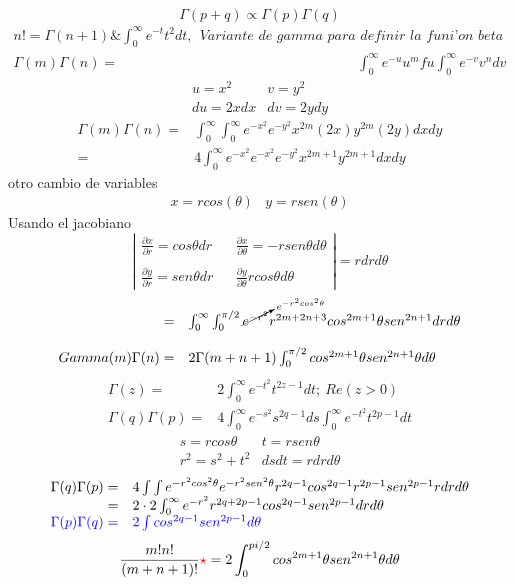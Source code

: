\documentclass{article}
\theoremstyle{definition}
\begin{document}
\[\Gamma (p+q)\propto \Gamma (p)\Gamma (q)\]
\[
\begin{array}{rl}
	n!= \Gamma (n+1)\& \int^{\infty}_0 e^{-t}t^2 dt,\ \ \textit{Variante de gamma para definir la funi'on beta}\\
	\Gamma (m)\Gamma (n)=& \int^{\infty}_0 e^{-u}u^m fu\int^{\infty}_0 e^{-v}v^n dv
\end{array}
\]
\[
\begin{array}{cc}
	u=x^2 & v=y^2\\
	du=2xdx & dv= 2ydy
\end{array}
\]
\[
\begin{array}{rl}
	\Gamma (m)\Gamma (n) =& \int^{\infty}_0 \int^{\infty}_0e^{-x^{2}}e^{-y^{2}}x^{2m}(2x)y^{2m}(2y)dxdy\\
	=& 4\int^{\infty}_0 e^{-x^{2}} e^{-x^{2}}e^{-y^{2}}x^{2m+1}y^{2m+1}dxdy
\end{array}
\]
otro cambio de variables
\[
\begin{array}{cc}
	x=rcos(\theta) & y=rsen(\theta)
\end{array}
\]
Usando el jacobiano
\[
\left|
\begin{array}{ccc}
	\frac{\partial x}{\partial r}= cos\theta dr && \frac{\partial x}{\partial \theta} =-rsen\theta d\theta\\
	\\
	\frac{\partial y}{\partial r} = sen\theta dr && \frac{\partial y}{\partial \theta} r cos\theta d\theta
\end{array}\right|
=rdrd\theta
\]
\[
\begin{array}{rl}
	=& \int^{\infty}_0\int^{\pi/2}_0 \cancelto{e^{-r^2cos^2\theta}}{e^{-r^2}} r^{2m+2n+3} cos^{2m+1}\theta sen ^{2n+1}drd\theta\\
	\\Gamma (m)\Gamma (n) =& 2 \Gamma (m+n+1)\int^{\pi/2}_0 cos^{2m+1}\theta sen^{2n+1}\theta d\theta
\end{array}
\]
\[
\begin{array}{rl}
	\Gamma (z)=& 2 \int^{\infty}_0 e^{-t^2}t^{2z-1}dt;\ Re(z>0)\\
	\Gamma (q)\Gamma (p) =& 4\int^{\infty}_0 e^{-s^2} s^{2q-1}ds\int^{\infty}_0 e^{-t^2}t^{2p-1}dt
\end{array}
\]
\[
\begin{array}{cc}
	s=rcos\theta & t=rsen\theta\\
	r^2=s^2+t^2 & dsdt=rdrd\theta
\end{array}
\]
\[
\begin{array}{rl}
	\Gamma (q)\Gamma (p)=& 4\int\int e^{-r^2cos^2\theta}e^{-r^2sen^2\theta}r^{2q-1}cos^{2q-1}r^{2p-1}sen^{2p-1}rdrd\theta\\
	=& 2\cdot 2 \int^{\infty}_0 e^{-r^2}r^{2q+2p-1}cos^{2q-1}sen^{2p-1}drd\theta\\
	\textcolor{blue}{\Gamma (p)\Gamma (q)=}&\textcolor{blue}{2\int cos^{2q-1}sen^{2p-1} d\theta}
\end{array}
\]
\[\frac{m! n!}{(m+n+1)!}\textcolor{red}{\star}= 2\int^{pi /2}_0 cos^{2m+1}\theta sen^{2n+1}\theta d \theta\]
\end{document}
